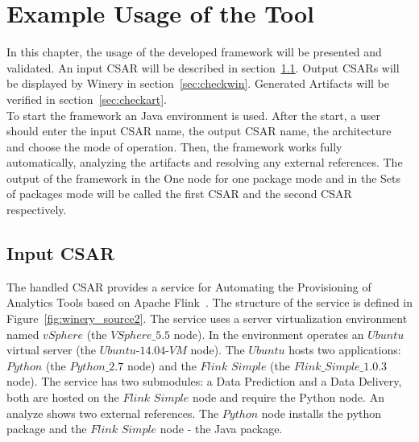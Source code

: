 
\chapter{Example Usage of the Tool}\label{chap:check}
In this chapter, the usage of the developed framework will be presented and validated.
An input CSAR will be described in section~\ref{sec:inputcsar}.
Output CSARs will be displayed by Winery in section~\ref{sec:checkwin}.
Generated Artifacts will be verified in section~\ref{sec:checkart}.\\
To start the framework an Java environment is used.
After the start, a user should enter the input CSAR name, the output CSAR name, the architecture and choose the mode of operation.
Then, the framework works fully automatically, analyzing the artifacts and resolving any external references.
The output of the framework in the One node for one package mode and in the Sets of packages mode will be called the first CSAR and the second CSAR respectively.

\section{Input CSAR}\label{sec:inputcsar}
The handled CSAR provides a service for Automating the Provisioning of Analytics Tools based on Apache Flink~\cite{csar_test}.
The structure of the service is defined in Figure~\ref{fig:winery_source2}. 
The service uses a server virtualization environment named $vSphere$ (the $VSphere\_5.5$ node). 
In the environment operates an $Ubuntu$ virtual server (the $Ubuntu$-$14.04$-$VM$ node).
The $Ubuntu$ hosts two applications: $Python$ (the $Python\_2.7$ node) and the $Flink$ $Simple$ (the $Flink\_Simple\_1.0.3$ node).
The service has two submodules: a Data Prediction and a Data Delivery, both are hosted on the $Flink$ $Simple$ node and require the Python node. 
An analyze shows two external references. The $Python$ node installs the python package and the $Flink$ $Simple$ node - the Java package. 
